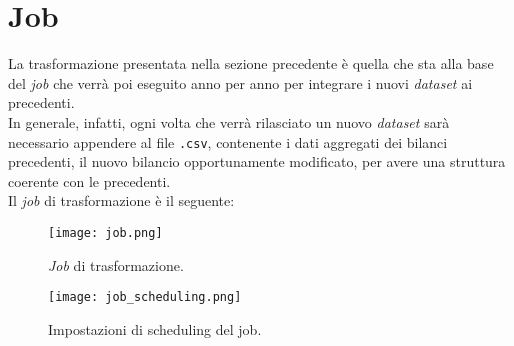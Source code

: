 		
	\section{Job}\label{sec:job}
		La trasformazione presentata nella sezione precedente è quella che sta alla base del \textit{job} che verrà poi eseguito anno per anno per integrare i nuovi \textit{dataset} ai precedenti.\\
		In generale, infatti, ogni volta che verrà rilasciato un nuovo \textit{dataset} sarà necessario appendere al file \texttt{.csv}, contenente i dati aggregati dei bilanci precedenti, il nuovo bilancio opportunamente modificato, per avere una struttura coerente con le precedenti.\\
		Il \textit{job} di trasformazione è il seguente:\\
		
		\begin{figure}[h!]
			\centering
				\texttt{[image: job.png]}
			\caption{\textit{Job} di trasformazione.}
			\label{fig:job}
		\end{figure}
		
		\begin{figure}[h!]
			\centering
				\texttt{[image: job\_scheduling.png]}
			\caption{Impostazioni di scheduling del job.}
			\label{fig:job_scheduling}
		\end{figure}
		
